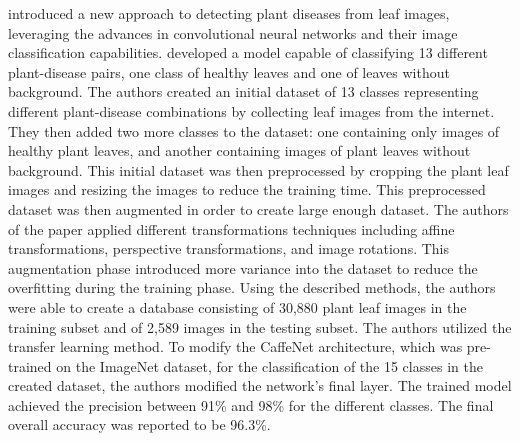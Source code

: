 \documentclass{BachelorBUI}
\begin{document}
\textcite{Sladojevic:2016} introduced a new approach to detecting plant diseases from leaf images, leveraging the advances in convolutional neural networks and their image classification capabilities. \textcite{Sladojevic:2016} developed a model capable of classifying 13 different plant-disease pairs, one class of healthy leaves and one of leaves without background. The authors created an initial dataset of 13 classes representing different plant-disease combinations by collecting leaf images from the internet. They then added two more classes to the dataset: one containing only images of healthy plant leaves, and another containing images of plant leaves without background. This initial dataset was then preprocessed by cropping the plant leaf images and resizing the images to reduce the training time. This preprocessed dataset was then augmented in order to create large enough dataset. The authors of the paper applied different transformations techniques including affine transformations, perspective transformations, and image rotations. This augmentation phase introduced more variance into the dataset to reduce the overfitting during the training phase. Using the described methods, the authors were able to create a database consisting of 30,880 plant leaf images in the training subset and of 2,589 images in the testing subset. The authors utilized the transfer learning method. To modify the CaffeNet architecture, which was pre-trained on the ImageNet dataset, for the classification of the 15 classes in the created dataset, the authors modified the network's final layer. The trained model achieved the precision between 91\% and 98\% for the different classes. The final overall accuracy was reported to be 96.3\%.
\end{document}
